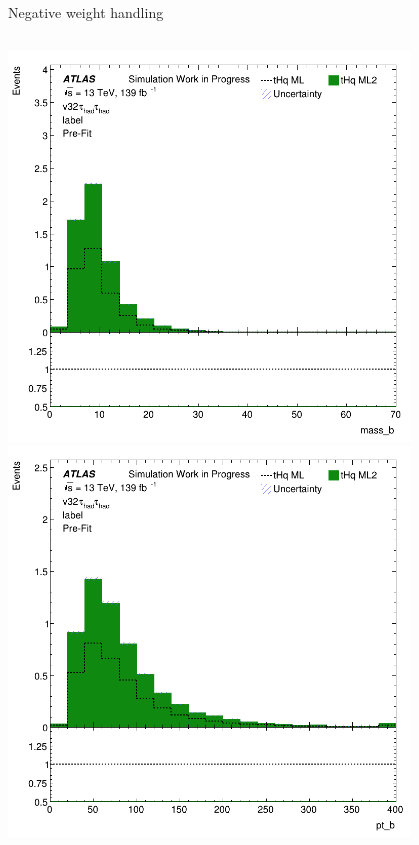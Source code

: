 \begin{frame}{Negative weight handling}
\begin{columns}
\begin{column}{0.5\textwidth}
      \includegraphics[width=0.8\textwidth]{mass_b}
      \includegraphics[width=0.8\textwidth]{pt_b}
    \end{column}
  \end{columns}
\end{frame}


